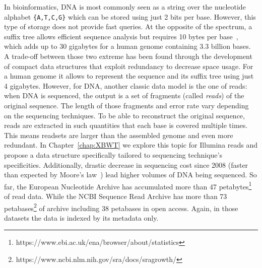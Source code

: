 In bioinformatics, DNA is most commonly seen as a string over the nucleotide alphabet \texttt{\{A,T,C,G\}} which can be stored using just 2 bits per base. However, this type of storage does not provide fast queries. At the opposite of the spectrum, a suffix tree allows efficient sequence analysis but requires 10 bytes per base~\cite{navarro2016compact}, which adds up to 30 gigabytes for a human genome containing 3.3 billion bases. A trade-off between those two extreme has been found through the development of compact data structures that exploit redundancy to decrease space usage. For a human genome it allows to represent the sequence and its suffix tree using just 4 gigabytes. 
However, for DNA, another classic data model is the one of reads: when DNA is sequenced, the output is a set of fragments (called \emph{reads}) of the original sequence. The length of those fragments and error rate vary depending on the sequencing techniques. To be able to reconstruct the original sequence, reads are extracted in such quantities that each base is covered multiple times. This means readsets are larger than the assembled genome and even more redundant. In Chapter~\ref{chap:XBWT} we explore this topic for Illumina reads and propose a data structure specifically tailored to sequencing technique's specificities. 
Additionally, drastic decrease in sequencing cost since 2008 (faster than expected by Moore's law~\cite{muir2016real}) lead higher volumes of DNA being sequenced. 
So far, the European Nucleotide Archive has accumulated more than 47 petabytes\footnote{https://www.ebi.ac.uk/ena/browser/about/statistics} of read data.
While the NCBI Sequence Read Archive has more than 73 petabases\footnote{https://www.ncbi.nlm.nih.gov/sra/docs/sragrowth/} of archive including 38 petabases in open access. Again, in those datasets the data is indexed by its metadata only.\\

